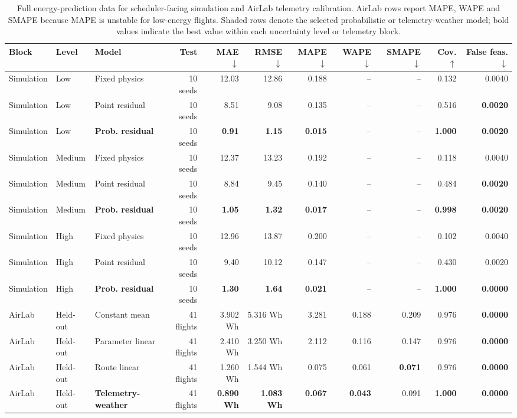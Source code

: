\begin{table}[H]
\centering
\caption{Full energy-prediction data for scheduler-facing simulation and AirLab telemetry calibration. AirLab rows report MAPE, WAPE and SMAPE because MAPE is unstable for low-energy flights. Shaded rows denote the selected probabilistic or telemetry-weather model; bold values indicate the best value within each uncertainty level or telemetry block.}
\label{tab:energy-evidence}
\small
\setlength{\tabcolsep}{2.1pt}
\begin{tabular}{@{}lllrrrrrrrr@{}}
\toprule
Block & Level & Model & Test & MAE $\downarrow$ & RMSE $\downarrow$ & MAPE $\downarrow$ & WAPE $\downarrow$ & SMAPE $\downarrow$ & Cov. $\uparrow$ & False feas. $\downarrow$ \\
\midrule
Simulation & Low & Fixed physics & 10 seeds & 12.03 & 12.86 & 0.188 & -- & -- & 0.132 & 0.0040 \\
Simulation & Low & Point residual & 10 seeds & 8.51 & 9.08 & 0.135 & -- & -- & 0.516 & \textbf{0.0020} \\
\rowcolor{gray!10}
Simulation & Low & \textbf{Prob. residual} & 10 seeds & \textbf{0.91} & \textbf{1.15} & \textbf{0.015} & -- & -- & \textbf{1.000} & \textbf{0.0020} \\
\addlinespace[2pt]
Simulation & Medium & Fixed physics & 10 seeds & 12.37 & 13.23 & 0.192 & -- & -- & 0.118 & 0.0040 \\
Simulation & Medium & Point residual & 10 seeds & 8.84 & 9.45 & 0.140 & -- & -- & 0.484 & \textbf{0.0020} \\
\rowcolor{gray!10}
Simulation & Medium & \textbf{Prob. residual} & 10 seeds & \textbf{1.05} & \textbf{1.32} & \textbf{0.017} & -- & -- & \textbf{0.998} & \textbf{0.0020} \\
\addlinespace[2pt]
Simulation & High & Fixed physics & 10 seeds & 12.96 & 13.87 & 0.200 & -- & -- & 0.102 & 0.0040 \\
Simulation & High & Point residual & 10 seeds & 9.40 & 10.12 & 0.147 & -- & -- & 0.430 & 0.0020 \\
\rowcolor{gray!10}
Simulation & High & \textbf{Prob. residual} & 10 seeds & \textbf{1.30} & \textbf{1.64} & \textbf{0.021} & -- & -- & \textbf{1.000} & \textbf{0.0000} \\
\addlinespace[2pt]
AirLab & Held-out & Constant mean & 41 flights & 3.902 Wh & 5.316 Wh & 3.281 & 0.188 & 0.209 & 0.976 & \textbf{0.0000} \\
AirLab & Held-out & Parameter linear & 41 flights & 2.410 Wh & 3.250 Wh & 2.112 & 0.116 & 0.147 & 0.976 & \textbf{0.0000} \\
AirLab & Held-out & Route linear & 41 flights & 1.260 Wh & 1.544 Wh & 0.075 & 0.061 & \textbf{0.071} & 0.976 & \textbf{0.0000} \\
\rowcolor{gray!10}
AirLab & Held-out & \textbf{Telemetry-weather} & 41 flights & \textbf{0.890 Wh} & \textbf{1.083 Wh} & \textbf{0.067} & \textbf{0.043} & 0.091 & \textbf{1.000} & \textbf{0.0000} \\
\bottomrule
\end{tabular}
\end{table}
